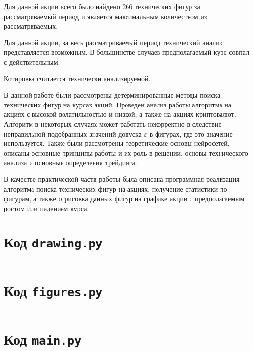 \documentclass[bachelor, och, coursework]{SCWorks}
\begin{document}
        Для данной акции всего было найдено 266 технических фигур за 
        рассматриваемый период и является максимальным количеством из
        рассматриваемых.
        
        Для данной акции, за весь рассматриваемый период технический анализ 
        представляется возможным. В большинстве случаев предполагаемый курс 
        совпал с действительным.
        
        Котировка считается технически анализируемой.
\conclusion

    В данной работе были рассмотрены детерминированные методы поиска технических
    фигур на курсах акций. Проведен анализ работы алгоритма на акциях с высокой
    волатильностью и низкой, а также на акциях криптовалют. Алгоритм в некоторых
    случаях может работать некорректно в следствие неправильной подобранных
    значений допуска $\varepsilon$ в фигурах, где это значение используется.
    Также были рассмотрены теоретические основы нейросетей, описаны основные
    принципы работы и их роль в решении, основы технического анализа и основные
    определения трейдинга. 

    В качестве практической части работы была описана программная реализация
    алгоритма поиска технических фигур на акциях, получение статистики по
    фигурам, а также отрисовка данных фигур на графике акции с предполагаемым
    ростом или падением курса.


    
    

\appendix
    \section{Код \texttt{drawing.py}}
    \inputminted{py}{code/drawing.py}

    \section{Код \texttt{figures.py}}
    \inputminted{py}{code/figures.py}

    \section{Код \texttt{main.py}}
    \inputminted{py}{code/main.py}
\end{document}

